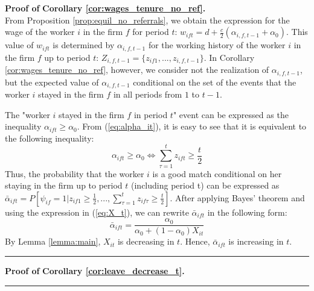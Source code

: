 \documentclass[12pt]{article}
\newenvironment{proof}[1][Proof of]{\noindent\textbf{#1} }{\ \rule{0.5em}{0.5em}}
\begin{document}
\begin{proof}
\textbf{Corollary \ref{cor:wages_tenure_no_ref}.}\\
From Proposition \ref{prop:equil_no_referrals}, we obtain the expression for the wage of the worker $i$ in the firm $f$ for period $t$: $w_{ift} = d+\frac{c}{2}(\alpha_{i,f,t-1}+\alpha_0)$. This value of $w_{ift}$ is determined by $\alpha_{i,f,t-1}$ for the working history of the worker $i$ in the firm $f$ up to period $t$: $Z_{i,f,t-1} = \lbrace z_{if1}, ... , z_{i,f,t-1} \rbrace$. In Corollary \ref{cor:wages_tenure_no_ref}, however, we consider not the realization of $\alpha_{i,f,t-1}$, but the expected value of $\alpha_{i,f,t-1}$ conditional on the set of the events that the worker $i$ stayed in the firm $f$ in all periods from $1$ to $t-1$. 

The "worker $i$ stayed in the firm $f$ in period $t$" event can be expressed as the inequality $\alpha_{ift} \geq \alpha_0$. From (\ref{eq:alpha_it}), it is easy to see that it is equivalent to the following inequality:
\begin{equation}
\alpha_{ift} \geq \alpha_0 \Leftrightarrow \sum_{\tau=1}^t z_{ift} \geq \frac{t}{2}
\end{equation}
Thus, the probability that the worker $i$ is a good match conditional on her staying in the firm up to period $t$ (including period t) can be expressed as $\bar{\alpha}_{ift}= P[\psi_{if}=1 \vert z_{if1}\geq \frac{1}{2},...,\sum_{\tau=1}^{t}z_{if \tau}\geq \frac{t}{2}]$. After applying Bayes' theorem and using the expression in (\ref{eq:X_t}), we can rewrite $\bar{\alpha}_{ift}$ in the following form:
\begin{equation}\label{eq:cor1_alpha_tilde}
\bar{\alpha}_{ift} = \frac{\alpha_0}{\alpha_0 + (1-\alpha_0)X_{it}}
\end{equation}
By Lemma \ref{lemma:main}, $X_{it}$ is decreasing in $t$. Hence, $\bar{\alpha}_{ift}$ is increasing in $t$.
\end{proof}

\begin{proof}
\textbf{Corollary \ref{cor:leave_decrease_t}.}
\end{proof}

\end{document}
